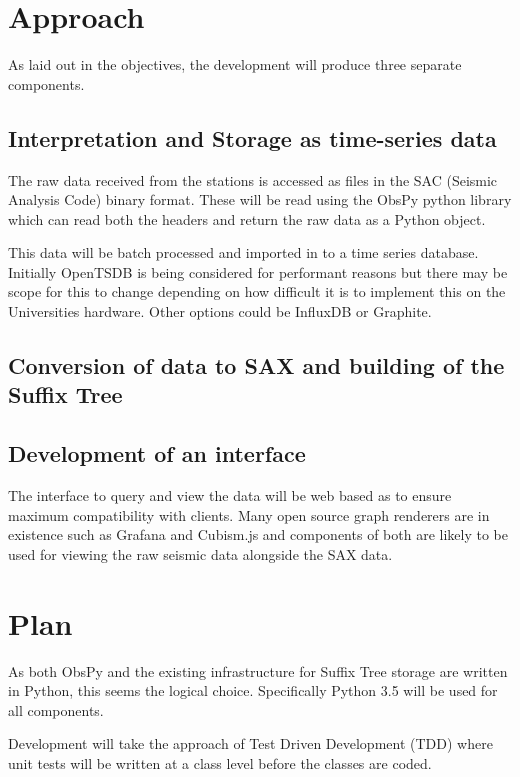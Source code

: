 \documentclass[11pt]{scrartcl}
\begin{document}
\section{Approach}
	As laid out in the objectives, the development will produce three separate components.
	
\subsection{Interpretation and Storage as time-series data}
	The raw data received from the stations is accessed as files in the SAC (Seismic Analysis Code) binary format.  These will be read using the ObsPy python library which can read both the headers and return the raw data as a Python object.
	
	This data will be batch processed and imported in to a time series database.  Initially OpenTSDB is being considered for performant reasons but there may be scope for this to change depending on how difficult it is to implement this on the Universities hardware.  Other options could be InfluxDB or Graphite.

\subsection{Conversion of data to SAX and building of the Suffix Tree}

\subsection{Development of an interface}
	The interface to query and view the data will be web based as to ensure maximum compatibility with clients.  Many open source graph renderers are in existence such as Grafana and Cubism.js and components of both are likely to be used for viewing the raw seismic data alongside the SAX data.

\section{Plan}
	As both ObsPy and the existing infrastructure for Suffix Tree storage are written in Python, this seems the logical choice.  Specifically Python 3.5 will be used for all components.	
	
	Development will take the approach of Test Driven Development (TDD) where unit tests will be written at a class level before the classes are coded.
\end{document}
